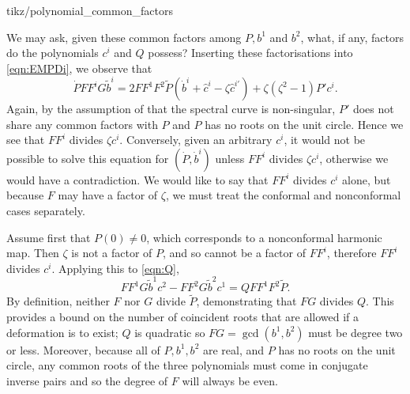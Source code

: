 {tikz/polynomial_common_factors}

We may ask, given these common factors among $P, b^1$ and $b^2$, what, if any, factors do the polynomials $c^i$ and $Q$ possess? Inserting these factorisations into \eqref{eqn:EMPDi}, we observe that
\[
\dot{P} F F^i G \tilde{b}^i = 2 F F^1 F^2 \tilde{P} (\dot{b}^i + \hat{c}^i - ζ\hat{c}^{i\prime}) + ζ(ζ^2-1 ) P'c^i.
\]
Again, by the assumption of that the spectral curve is non-singular, $P'$ does not share any common factors with $P$ and $P$ has no roots on the unit circle. Hence we see that $FF^i$ divides $ζc^i$. Conversely, given an arbitrary $c^i$, it would not be possible to solve this equation for $(\dot{P},\dot{b}^i)$ unless $FF^i$ divides $ζc^i$, otherwise we would have a contradiction. We would like to say that $FF^i$ divides $c^i$ alone, but because $F$ may have a factor of $ζ$, we must treat the conformal and nonconformal cases separately.

Assume first that $P(0)\neq 0$, which corresponds to a nonconformal harmonic map. Then $ζ$ is not a factor of $P$, and so cannot be a factor of $FF^i$, therefore $FF^i$ divides $c^i$. Applying this to \eqref{eqn:Q},
\[
FF^1G\tilde{b}^1 c^2 - FF^2G\tilde{b}^2 c^1 = Q FF^1F^2\tilde{P}.
\]
By definition, neither $F$ nor $G$ divide $\tilde{P}$, demonstrating that $FG$ divides $Q$. This provides a bound on the number of coincident roots that are allowed if a deformation is to exist; $Q$ is quadratic so $FG = \gcd(b^1,b^2)$ must be degree two or less. Moreover, because all of $P,b^1,b^2$ are real, and $P$ has no roots on the unit circle, any common roots of the three polynomials must come in conjugate inverse pairs and so the degree of $F$ will always be even.

